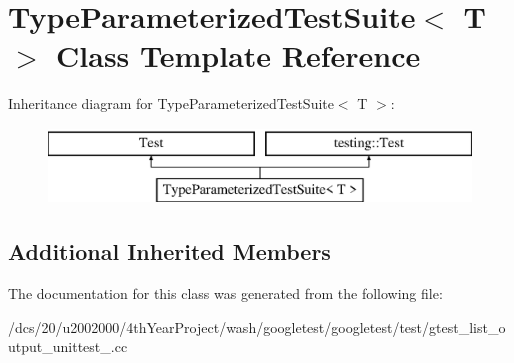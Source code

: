 \hypertarget{classTypeParameterizedTestSuite}{}\section{Type\+Parameterized\+Test\+Suite$<$ T $>$ Class Template Reference}
\label{classTypeParameterizedTestSuite}
Inheritance diagram for Type\+Parameterized\+Test\+Suite$<$ T $>$\+:\begin{figure}[H]
\begin{center}
\leavevmode
\includegraphics[height=2.000000cm]{classTypeParameterizedTestSuite}
\end{center}
\end{figure}
\subsection*{Additional Inherited Members}


The documentation for this class was generated from the following file\+:\begin{DoxyCompactItemize}
\item 
/dcs/20/u2002000/4th\+Year\+Project/wash/googletest/googletest/test/gtest\+\_\+list\+\_\+output\+\_\+unittest\+\_\+.\+cc\end{DoxyCompactItemize}
